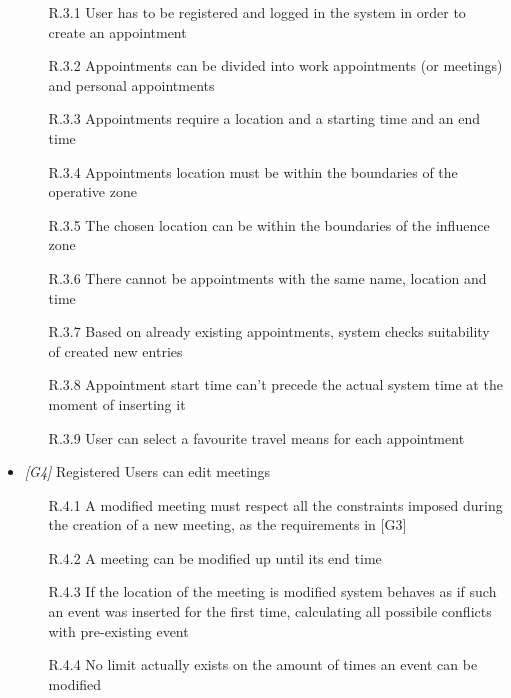\begin{itemize}
 \begin{itemize}
                        \item [R.3.1] User has to be registered and logged in the system in order to create an
appointment
                        \item [R.3.2] Appointments can be divided into work appointments (or meetings) and personal appointments
                        \item [R.3.3] Appointments require a location and a starting time and an end time
                        \item [R.3.4] Appointments location must be within the boundaries of the operative zone
                        \item [R.3.5] The chosen location can be within the boundaries of the influence zone
                        \item [R.3.6] There cannot be appointments with the same name, location and time
                        \item [R.3.7] Based on already existing appointments, system checks suitability of created new entries
                        \item [R.3.8] Appointment start time can't precede the actual system time at the moment of inserting it                                 \item [R.3.9] User can select a favourite travel means for each appointment
                        
                  \end{itemize}
                  
\item \textit{[G4]} Registered Users can edit meetings

                  \begin{itemize}
                       \item  [R.4.1] A modified meeting must respect all the constraints imposed during the creation of a new meeting, as the requirements in [G3]
                       \item [R.4.2] A meeting can be modified up until its end time
                       \item [R.4.3] If the location of the meeting is modified system behaves as if such an event was inserted for the first time, calculating all possibile conflicts with pre-existing event
                       \item [R.4.4] No limit actually exists on the amount of times an event can be modified                     


\end{itemize}
\end{itemize}
